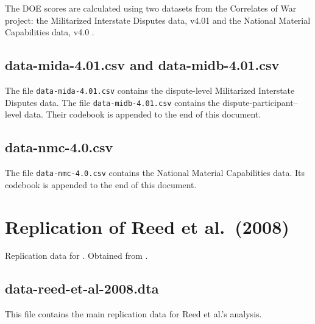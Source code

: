 \documentclass[12pt]{article}
\begin{document}
The DOE scores are calculated using two datasets from the Correlates of War project: the Militarized Interstate Disputes data, v4.01 \citep{Palmer:2015hp} and the National Material Capabilities data, v4.0 \citep{singer1972}.

\subsection{data-mida-4.01.csv and data-midb-4.01.csv}

The file \texttt{data-mida-4.01.csv} contains the dispute-level Militarized Interstate Disputes data.
The file \texttt{data-midb-4.01.csv} contains the dispute-participant--level data.
Their codebook is appended to the end of this document.

\subsection{data-nmc-4.0.csv}

The file \texttt{data-nmc-4.0.csv} contains the National Material Capabilities data.
Its codebook is appended to the end of this document.


\section{Replication of Reed et al.\ (2008)}

Replication data for \citet{reed2008war}.
Obtained from \citet{reed2008data}.

\subsection{data-reed-et-al-2008.dta}

This file contains the main replication data for Reed et al.'s analysis.
\end{document}
